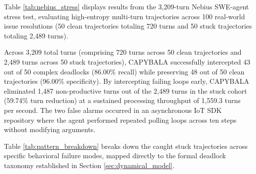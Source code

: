 \documentclass[journal]{IEEEtran}
\begin{document}
Table \ref{tab:nebius_stress} displays results from the 3,209-turn Nebius SWE-agent stress test, evaluating high-entropy multi-turn trajectories across 100 real-world issue resolutions (50 clean trajectories totaling 720 turns and 50 stuck trajectories totaling 2,489 turns).

\begin{table}[!t]
\caption{Large-Scale Stress Test on Nebius SWE-agent Corpus (3,209 Total Turns: 720 Clean Turns and 2,489 Stuck Turns across 100 Trajectories)}
\label{tab:nebius_stress}
\centering
{}
\end{table}

Across 3,209 total turns (comprising 720 turns across 50 clean trajectories and 2,489 turns across 50 stuck trajectories), CAPYBALA successfully intercepted 43 out of 50 complex deadlocks (86.00\% recall) while preserving 48 out of 50 clean trajectories (96.00\% specificity). By intercepting failing loops early, CAPYBALA eliminated 1,487 non-productive turns out of the 2,489 turns in the stuck cohort (59.74\% turn reduction) at a sustained processing throughput of 1,559.3 turns per second. The two false alarms occurred in an asynchronous IoT SDK repository where the agent performed repeated polling loops across ten steps without modifying arguments.

Table \ref{tab:pattern_breakdown} breaks down the caught stuck trajectories across specific behavioral failure modes, mapped directly to the formal deadlock taxonomy established in Section \ref{sec:dynamical_model}.
\end{document}
